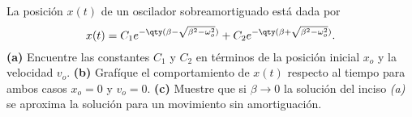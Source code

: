\begin{mdframed}[style=warning]
	\begin{ejercicio}
		La posición $x(t)$  de un oscilador sobreamortiguado está dada por
			$$ x(t) = C_1 e^{-\qty(\beta - \sqrt{\beta ^2 - \omega _o ^2})} + C_2 e^{-\qty(\beta + \sqrt{\beta ^2 - \omega _o ^2})}. $$
		\textbf{(a)} Encuentre las constantes $C_1$ y $C_2$ en términos de la posición inicial $x_o$ y la velocidad $v_o$. \textbf{(b)} Grafíque el comportamiento de $x(t)$ respecto al tiempo para ambos casos $x_o = 0$ y $v_o = 0$. \textbf{(c)} Muestre que si $\beta \to 0$ la solución del inciso \textit{(a)} se aproxima la solución para un movimiento sin amortiguación.
	\end{ejercicio}
\end{mdframed}




















